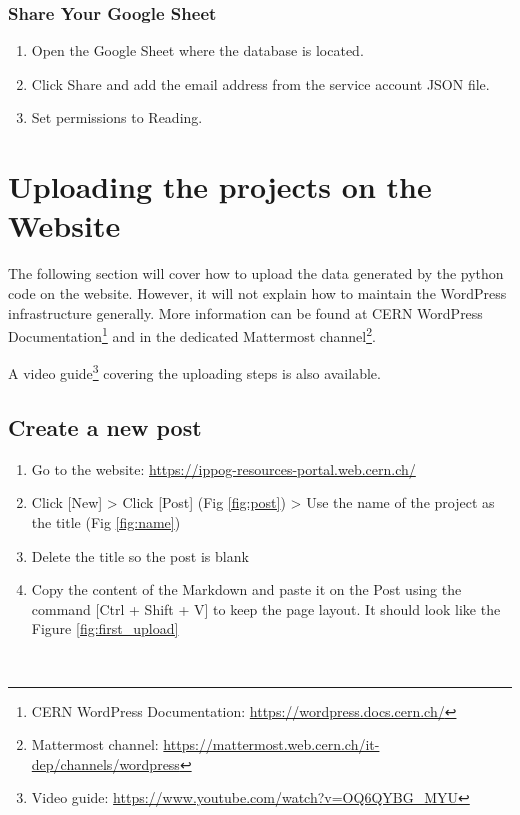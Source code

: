 \subsubsection*{Share Your Google Sheet}

\begin{enumerate}
    \item Open the Google Sheet where the database is located.
    \item Click Share and add the email address from the service account JSON file.
    \item Set permissions to Reading.
\end{enumerate}

\section{Uploading the projects on the Website}\label{sec:upload}

The following section will cover how to upload the data generated by the python code on the website. However, it will not explain how to maintain the WordPress infrastructure generally. More information can be found at CERN WordPress Documentation\footnote{CERN WordPress Documentation: \href{https://wordpress.docs.cern.ch/}{https://wordpress.docs.cern.ch/}} and in the dedicated Mattermost channel\footnote{Mattermost channel: \href{https://mattermost.web.cern.ch/it-dep/channels/wordpress}{https://mattermost.web.cern.ch/it-dep/channels/wordpress}}.

A video guide\footnote{Video guide: \href{https://www.youtube.com/watch?v=OQ6QYBG_MYU}{https://www.youtube.com/watch?v=OQ6QYBG\_MYU}} covering the uploading steps is also available. 

\newpage
\subsection*{Create a new post}\label{ssec:new_post}
\begin{enumerate}
    \item Go to the website: \href{https://ippog-resources-portal.web.cern.ch/}{https://ippog-resources-portal.web.cern.ch/}
    \item Click [New] > Click [Post] (Fig \ref{fig:post}) > Use the name of the project as the title (Fig \ref{fig:name})
    \item Delete the title so the post is blank
    \item Copy the content of the Markdown and paste it on the Post using the command [Ctrl + Shift + V] to keep  the page layout. It should look like the Figure \ref{fig:first_upload}
\end{enumerate}
\

